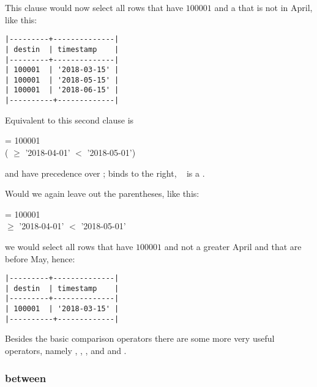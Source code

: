 This clause would now select all rows
that have  $100001$ and
a  that is not in April,
like this:

\begin{minipage}{\textwidth}
\begin{verbatim}
|---------+--------------|
| destin  | timestamp    |
|---------+--------------|
| 100001  | '2018-03-15' |
| 100001  | '2018-05-15' |
| 100001  | '2018-06-15' |
|----------+-------------|
\end{verbatim}
\end{minipage}

Equivalent to this second clause is

  = 100001 \\
\hspace*{0.45cm}  
( $\ge$ '2018-04-01'
  $<$ '2018-05-01')

 and  have precedence
over ;  binds to the right,
\ie\  is a .

Would we again leave out the parentheses,
like this:

  = 100001 \\
\hspace*{0.45cm}  
 $\ge$ '2018-04-01'
  $<$ '2018-05-01'

we would select all rows that have 
$100001$ and not a  greater April
and that are before May, hence:

\begin{minipage}{\textwidth}
\begin{verbatim}
|---------+--------------|
| destin  | timestamp    |
|---------+--------------|
| 100001  | '2018-03-15' |
|----------+-------------|
\end{verbatim}
\end{minipage}

Besides the basic comparison operators
there are some more very useful operators,
namely
,
,
,
 and
 and .

\subsubsection{between}

